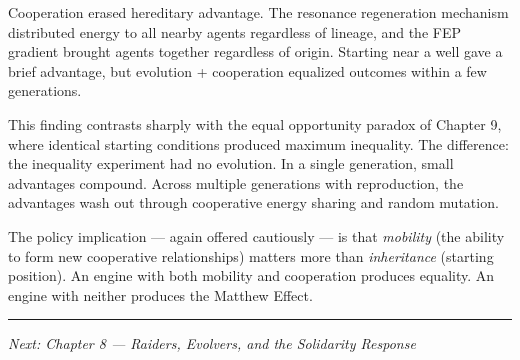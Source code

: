Cooperation erased hereditary advantage. The resonance regeneration mechanism distributed energy to all nearby agents regardless of lineage, and the FEP gradient brought agents together regardless of origin. Starting near a well gave a brief advantage, but evolution + cooperation equalized outcomes within a few generations.

This finding contrasts sharply with the equal opportunity paradox of Chapter 9, where identical starting conditions produced maximum inequality. The difference: the inequality experiment had no evolution. In a single generation, small advantages compound. Across multiple generations with reproduction, the advantages wash out through cooperative energy sharing and random mutation.

The policy implication --- again offered cautiously --- is that \emph{mobility} (the ability to form new cooperative relationships) matters more than \emph{inheritance} (starting position). An engine with both mobility and cooperation produces equality. An engine with neither produces the Matthew Effect.

\begin{center}\rule{0.5\linewidth}{0.5pt}\end{center}

\emph{Next: Chapter 8 --- Raiders, Evolvers, and the Solidarity Response}
